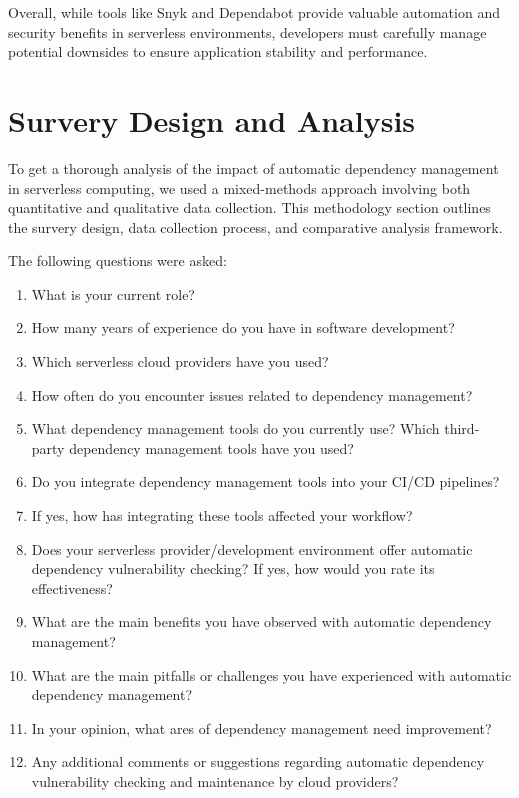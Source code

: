 \documentclass[sigconf]{acmart}
\begin{document}
Overall, while tools like Snyk and Dependabot provide valuable automation and security benefits in serverless environments, developers must carefully manage potential downsides to ensure application stability and performance.

\section{Survery Design and Analysis}

To get a thorough analysis of the impact of automatic dependency management in serverless computing, we used a mixed-methods approach involving both quantitative and qualitative data collection. This methodology section outlines the survery design, data collection process, and comparative analysis framework. 

The following questions were asked:

\begin{enumerate}
\item What is your current role? 
\item How many years of experience do you have in software development?	
\item Which serverless cloud providers have you used? 
\item How often do you encounter issues related to dependency management? 
\item What dependency management tools do you currently use? Which third-party dependency management tools have you used?
\item Do you integrate dependency management tools into your CI/CD pipelines?
\item If yes, how has integrating these tools affected your workflow?
\item Does your serverless provider/development environment offer automatic dependency vulnerability checking? If yes, how would you rate its effectiveness?	
\item What are the main benefits you have observed with automatic dependency management?
\item What are the main pitfalls or challenges you have experienced with automatic dependency management?
\item In your opinion, what ares of dependency management need improvement?	
\item Any additional comments or suggestions regarding automatic dependency vulnerability checking and maintenance by cloud providers?
\end{enumerate}
\end{document}
